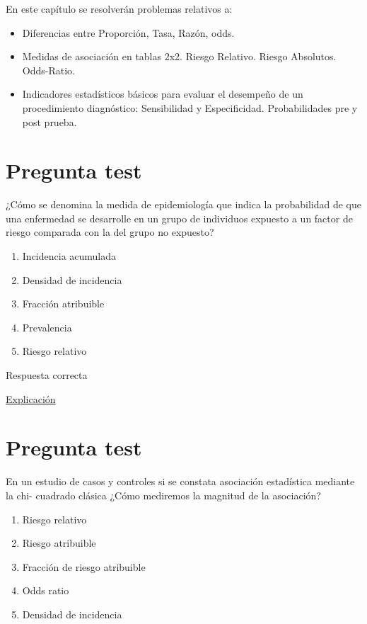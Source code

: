 \documentclass[
]{book}
\providecommand{\tightlist}{%
  \setlength{\itemsep}{0pt}\setlength{\parskip}{0pt}}
\begin{document}
En este capítulo se resolverán problemas relativos a:

\begin{itemize}
\tightlist
\item
  Diferencias entre Proporción, Tasa, Razón, odds.
\item
  Medidas de asociación en tablas 2x2. Riesgo Relativo. Riesgo Absolutos. Odds-Ratio.
\item
  Indicadores estadísticos básicos para evaluar el desempeño de un procedimiento diagnóstico: Sensibilidad y Especificidad. Probabilidades pre y post prueba.
\end{itemize}

\hypertarget{pregunta-test-82}{%
\section{Pregunta test}\label{pregunta-test-82}}

¿Cómo se denomina la medida de epidemiología que indica la probabilidad de que una enfermedad se desarrolle en un grupo de individuos expuesto a un factor de riesgo comparada con la del grupo no expuesto?

\begin{enumerate}
\def\labelenumi{\alph{enumi})}
\tightlist
\item
  Incidencia acumulada
\item
  Densidad de incidencia
\item
  Fracción atribuible
\item
  Prevalencia
\item
  Riesgo relativo
\end{enumerate}

Respuesta correcta

\href{https://es.wikipedia.org/wiki/Riesgo_relativo}{Explicación}

\hypertarget{pregunta-test-83}{%
\section{Pregunta test}\label{pregunta-test-83}}

En un estudio de casos y controles si se constata asociación estadística mediante la chi- cuadrado clásica ¿Cómo mediremos la magnitud de la asociación?

\begin{enumerate}
\def\labelenumi{\alph{enumi})}
\tightlist
\item
  Riesgo relativo
\item
  Riesgo atribuible
\item
  Fracción de riesgo atribuible
\item
  Odds ratio
\item
  Densidad de incidencia
\end{enumerate}
\end{document}
